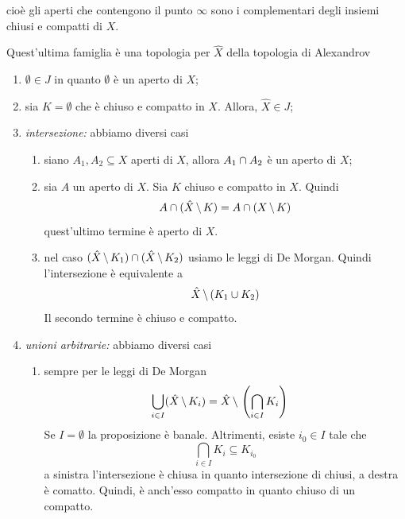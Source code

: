 \documentclass[a4paper]{article}
\begin{document}
cioè gli aperti che contengono il punto \(\infty\) sono i complementari degli insiemi chiusi e compatti
di \(X\).

\begin{snippetproposition}{Quest'ultima famiglia è una topologia per \(\hat{X}\) della topologia di Alexandrov}
    \begin{enumerate}
        \item \(\emptyset \in J\) in quanto \(\emptyset\) è un aperto di \(X\);
        \item sia \(K = \emptyset\) che è chiuso e compatto in \(X\). Allora, \(\hat{X} \in J\);
        \item \emph{intersezione:} abbiamo diversi casi
        \begin{enumerate}
            \item siano \(A_1, A_2 \subseteq X\) aperti di \(X\),
            allora \(A_1 \cap A_2\) è un aperto di \(X\);
            \item sia \(A\) un aperto di \(X\). Sia \(K\) chiuso e compatto in \(X\).
            Quindi
            \[
                A \cap (\hat{X} \,\backslash\, K) = A \cap (X \,\backslash\, K)
            \]
            quest'ultimo termine è aperto di \(X\).
            \item nel caso \((\hat{X} \,\backslash\, K_1) \cap (\hat{X} \,\backslash\, K_2)\)
            usiamo le leggi di De Morgan. Quindi l'intersezione è equivalente a
            \[
                \hat{X} \,\backslash\, (K_1 \cup K_2)
            \]
            Il secondo termine è chiuso e compatto.
        \end{enumerate}
        \item \emph{unioni arbitrarie:} abbiamo diversi casi
        \begin{enumerate}
            \item sempre per le leggi di De Morgan
                \begin{align*}
                    \bigcup_{i\in I} (\hat{X} \,\backslash\, K_i) &=
                    \hat{X} \,\backslash\, \left(\bigcap_{i\in I} K_i\right)
                \end{align*}
                Se \(I = \emptyset\) la proposizione è banale. Altrimenti,
                esiste \(i_0 \in I\) tale che
                \[
                    \bigcap_{i \in I} K_i \subseteq K_{i_0}
                \]
                a sinistra l'intersezione è chiusa in quanto intersezione di chiusi, a destra è comatto.
                Quindi, è anch'esso compatto in quanto chiuso di un compatto.

\end{enumerate}
\end{enumerate}
\end{snippetproposition}
\end{document}
